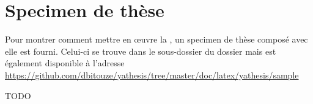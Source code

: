 \chapter{Specimen de thèse}\label{cha:specimen}

Pour montrer comment mettre en œuvre la \yatcl, un specimen de thèse composé
avec elle est fourni. Celui-ci se trouve dans le sous-dossier
 du dossier  mais est également
disponible à l'adresse
\url{https://github.com/dbitouze/yathesis/tree/master/doc/latex/yathesis/sample}


TODO

%
\iffalse
\fi
